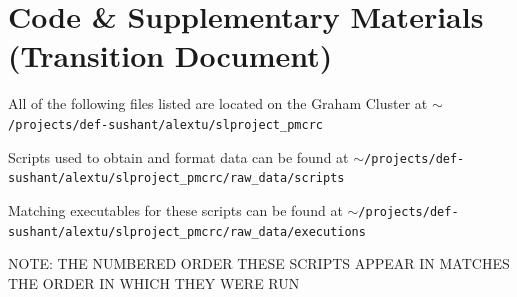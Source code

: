 \documentclass[10pt]{article}
\begin{document}
\clearpage\newpage
\section{Code \& Supplementary Materials (Transition Document)}

All of the following files listed are located on the Graham Cluster at \texttt{$\sim$/projects/def-sushant/alextu/\newline slproject\_pmcrc}

Scripts used to obtain and format data can be found at \texttt{$\sim$/projects/def-sushant/alextu/\newline slproject\_pmcrc/raw\_data/scripts}

Matching executables for these scripts can be found at \texttt{$\sim$/projects/def-sushant/alextu/\newline slproject\_pmcrc/raw\_data/executions}

NOTE: THE NUMBERED ORDER THESE SCRIPTS APPEAR IN MATCHES THE ORDER IN WHICH THEY WERE RUN
\end{document}
